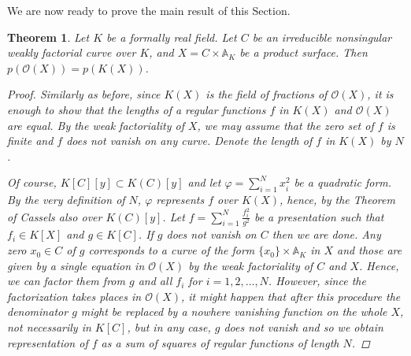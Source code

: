 \documentclass[12pt,reqno]{amsart}   	%
\newtheorem{thm}{Theorem}[section]
\theoremstyle{obs}
\theoremstyle{prob}
\theoremstyle{conj}
\theoremstyle{remark}
\newcommand{\OO}{\mathcal{O}}
\begin{document}
We are now ready to prove the main result of this Section.
\begin{thm}\label{main}
Let $K$ be a formally real field. Let $C$ be an irreducible nonsingular weakly factorial curve over $K$, and $X=C\times \mathbb{A}_K$ be a product surface. Then $p(\OO(X))=p(K(X))$.

\begin{proof}
Similarly as before, since $K(X)$ is the field of fractions of $\OO(X)$, it is enough to show that the lengths of a regular functions $f$ in $K(X)$ and $\OO(X)$ are equal. By the weak factoriality of $X$, we may assume that the zero set of $f$ is finite and $f$ does not vanish on any curve. Denote the length of $f$ in $K(X)$ by $N$.






Of course, $K[C][y] \subset K(C)[y]$ and let $\varphi = \sum_{i=1}^N x_i^2$ be a quadratic form. By the very definition of $N$, $\varphi$ represents $f$ over $K(X)$, hence, by the Theorem of Cassels also over $K(C)[y]$. Let $f=\sum_{i=1}^N \frac{f_i^2}{g^2}$ be a presentation such that $f_i \in K[X]$ and $g \in K[C]$. If $g$ does not vanish on $C$ then we are done. Any zero $x_0 \in C$ of $g$ corresponds to a curve of the form $\{x_0 \} \times \mathbb{A}_K$ in $X$ and those are given by a single equation in $\OO(X)$ by the weak factoriality of $C$ and $X$. Hence, we can factor them from $g$ and all $f_i$ for $i=1,2,\dots, N$. However, since the factorization takes places in $\OO(X)$, it might happen that after this procedure the denominator $g$ might be replaced by a nowhere vanishing function on the whole $X$, not necessarily in $K[C]$, but in any case, $g$ does not vanish and so we obtain representation of $f$ as a sum of squares of regular functions of length $N$.



\end{proof}
\end{thm}
\end{document}
